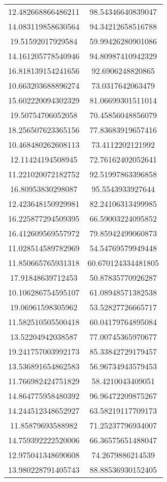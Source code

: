 \begin{table}
\begin{tabular}{cc}
12.482668866486211 & 98.54346640839047 \\
14.083119858630564 & 94.34212658516788 \\
19.51592017929584 & 59.99426280901086 \\
14.161205778540946 & 94.80987410942329 \\
16.818139154241656 & 92.6906248820865 \\
10.663203688896274 & 73.0317642063479 \\
15.602220094302329 & 81.06699301511014 \\
19.50754706052058 & 70.45856048856079 \\
18.256507623365156 & 77.83683919657416 \\
10.468480262608113 & 73.4112202121992 \\
12.11424194508945 & 72.76162402052641 \\
11.221020072182752 & 92.51997863396858 \\
16.80953830298087 & 95.5543933927644 \\
12.423648150929981 & 82.24106313499985 \\
16.225877294509395 & 66.59003224095852 \\
16.412609569557972 & 79.85942499060873 \\
11.028514589782969 & 54.54769579949448 \\
11.850665765931318 & 60.670124334481805 \\
17.91848639712453 & 50.87835770926287 \\
10.106286754595107 & 61.08948571382538 \\
19.06961598305962 & 53.52827726665717 \\
11.582510505500418 & 60.04179764895084 \\
13.52204942038587 & 77.00745365970677 \\
19.241757003992173 & 85.33842729179457 \\
13.536891654862583 & 56.96734943579453 \\
11.766982424751829 & 58.4210043409051 \\
14.864775958480392 & 96.96472209875267 \\
14.244512348652927 & 63.58219117709173 \\
11.85879693588982 & 71.25237796934007 \\
14.759392222520006 & 66.36575651488047 \\
12.975041348690608 & 74.2679886214539 \\
13.980228791405743 & 88.88536930152405 \\

\end{tabular}
\end{table}

